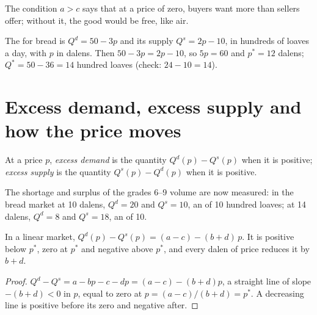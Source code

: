 The condition $a > c$ says that at a price of zero, buyers want more than sellers offer; without it, the good would be free, like air.

\begin{example}\label{ex:g10:market-equilibrium:bread}
The  for bread is $Q^d = 50 - 3p$ and its supply $Q^s = 2p - 10$, in hundreds of loaves a day, with $p$ in dalens. Then $50 -
3p = 2p - 10$, so $5p = 60$ and $p^* = 12$ dalens; $Q^* = 50 - 36 = 14$ hundred loaves (check: $24 - 10 = 14$).
\end{example}

\section{Excess demand, excess supply and how the price moves}\label{sec:g10:market-equilibrium:excess}

\begin{definition}\label{def:g10:market-equilibrium:excess-demand}
At a price $p$, \emph{excess demand} is the quantity $Q^d(p) - Q^s(p)$ when it is positive; \emph{excess
supply} is the quantity $Q^s(p) - Q^d(p)$ when it is positive.
\end{definition}
\label{def:g10:market-equilibrium:excess-supply}

The shortage and surplus of the grades 6--9 volume are now measured: in the bread market at 10 dalens, $Q^d = 20$ and $Q^s = 10$, an
 of 10 hundred loaves; at 14 dalens, $Q^d = 8$ and $Q^s = 18$, an  of 10.

\begin{proposition}\label{prop:g10:market-equilibrium:excess}
In a linear market, $Q^d(p) - Q^s(p) = (a - c) - (b + d)\,p$. It is positive below $p^*$, zero at $p^*$ and negative above $p^*$, and
every dalen of price reduces it by $b + d$.
\end{proposition}
\begin{proof}
$Q^d - Q^s = a - bp - c - dp = (a - c) - (b + d)p$, a straight line of slope $-(b + d) < 0$ in $p$, equal to zero at $p = (a - c)/(b +
d) = p^*$. A decreasing line is positive before its zero and negative after.
\end{proof}

